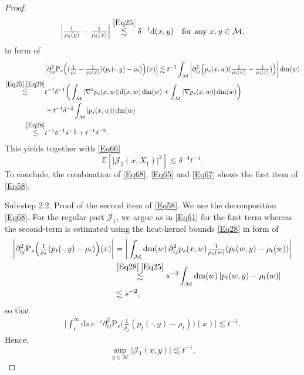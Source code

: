 \documentclass[11pt,a4paper,oneside]{amsart}
\numberwithin{equation}{section}
\newcommand{\dd}{\mathrm{d}}
\newcommand{\m}{\mathrm{m}}
\begin{document}
\begin{proof}
\begin{equation}
\Big\vert \tfrac{1}{\rho_\delta(y)}-\tfrac{1}{\rho_\delta(x)}\Big\vert\stackrel{\eqref{Eq25}}{\lesssim} \delta^{-1}\dd(x,y)\quad \text{for any $x, y\in\mathcal{M}$},
\end{equation}
%
in form of
%
\begin{equation}\label{Eq69}
\begin{aligned}
& \Big\vert\partial^2_{ij}\text{P}_s\Big((\tfrac{1}{\rho_{\delta}}-\tfrac{1}{\rho_{\delta}(x)})(p_t(\cdot,y)-\rho_t)\Big)(x)\Big\vert\lesssim t^{-1}\int_{\mathcal{M}}\bigg\vert \partial^2_{ij}\Big(p_s(x,w)(\tfrac{1}{\rho_{\delta}(w)}-\tfrac{1}{\rho_{\delta}(x)})\Big)\bigg\vert\,\dd \m(w)\\
\stackrel{\eqref{Eq25},\eqref{Eq29}}{\lesssim}&t^{-1}\delta^{-1}\bigg(\int_{\mathcal{M}}\vert\nabla^2 p_s(x,w)\vert \dd(x,w)\,\dd \m(w)+\int_{\mathcal{M}}\vert\nabla p_s(x,w)\vert\,\dd \m(w)\bigg)\\
& +t^{-1}\delta^{-2}\int_{\mathcal{M}}\vert p_s(x,w)\vert\,\dd \m(w)\\
\stackrel{\eqref{Eq28}}{\lesssim} &t^{-1}\delta^{-1}s^{-\frac{1}{2}}+t^{-1}\delta^{-2}.
\end{aligned}
\end{equation}
%
This yields together with \eqref{Eq66}
%
\begin{equation}\label{Eq67}
\mathbb{E}[\vert\mathcal{J}_2(x,X_1)\vert^2]\lesssim \delta^{-4}t^{-1}.
\end{equation}
%
To conclude, the combination of \eqref{Eq68}, \eqref{Eq65} and \eqref{Eq67} shows the first item of \eqref{Eq58}.

%
\medskip
%

{\sc Sub-step 2.2. Proof of the second item of \eqref{Eq58}. }We use the decomposition \eqref{Eq68}. For the regular-part $\mathcal{J}_1$, we argue as in \eqref{Eq61} for the first term whereas the second-term is estimated using the heat-kernel bounds \eqref{Eq28} in form of
%
\begin{align*}
\bigg\vert\partial^2_{ij}\text{P}_s\Big(\tfrac{1}{\rho_\delta}(p_t(\cdot,y)-\rho_t)\Big)(x)\bigg\vert&=\bigg\vert\int_{\mathcal{M}}\dd \m(w)\,\partial^2_{ij}p_{s}(x,w)\tfrac{1}{\rho_{\delta}(w)}(p_t(w,y)-\rho_t(w))\bigg\vert\\
&\stackrel{\eqref{Eq28},\eqref{Eq25}}{\lesssim} s^{-2}\int_{\mathcal{M}}\dd \m(w)\, \vert p_t(w,y)-\rho_t(w)\vert\\
&\lesssim s^{-2},
\end{align*}
%
so that
%
\begin{align*}
\bigg\vert\int_{t}^{\infty}\dd s\, e^{-s}\partial^2_{ij}\text{P}_s\Big(\tfrac{1}{\rho_\delta}(p_t(\cdot,y)-\rho_t)\Big)(x)\bigg\vert\lesssim t^{-1}.
\end{align*}
%
Hence,
%
\begin{equation}\label{Eq71}
\sup_{y\in\mathcal{M}}\vert\mathcal{J}_1(x,y)\vert\lesssim t^{-1}.
\end{equation}
%
%
\medskip
%


\end{proof}
\end{document}
